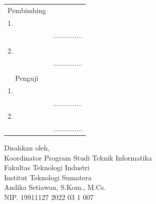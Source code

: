 \begin{center}
	\justify
    \setlength{\tabcolsep}{0pt}
    \begin{tabular}{ m{0.5cm}  m{} >{\centering\arraybackslash}m{}}
        \multicolumn{2}{c}{\hspace*{70pt}Pembimbing} & \multicolumn{1}{c}{} \\[2pt]
		1. & \printnamadosbinga & \\
		 & \printnipdosbinga & ............... \\%
		 & \\
		2. & \printnamadosbingb & \\
		& \printnipdosbingb & ............... \\%
		& \\
		\multicolumn{2}{c}{\hspace*{70pt}Penguji} & \multicolumn{1}{c}{} \\[2pt]
		1. & \printnamapengujia & \\
		& \printnippengujia & ............... \\[4pt]
		2. & \printnamapengujib & \\
		& \printnippengujib & ............... \\
    \end{tabular}

	\begin{center}
		\fontsize{10pt}{10pt}
        \vspace{0.45cm}
		Disahkan oleh,\\
		Koordinator Program Studi Teknik Informatika\\
		Fakultas Teknologi Industri\\
		Institut Teknologi Sumatera
		\vspace{1.8cm}\\
		Andika Setiawan, S.Kom., M.Cs. \\ %
		NIP. 19911127 2022 03 1 007 \\
	\end{center}
	\vfill

\end{center}
\clearpage